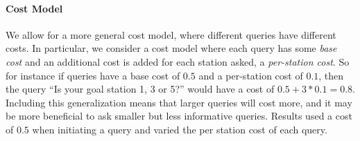 \documentclass[letterpaper]{article}
\begin{document}
    \paragraph{Cost Model} We allow for a more general cost model, where different queries have different costs. In particular, we consider a cost model where each query has some \emph{base cost} and an additional cost is added for each station asked, a \emph{per-station cost}. So for instance if queries have a base cost of $0.5$ and a per-station cost of $0.1$, then the query ``Is your goal station 1, 3 or 5?'' would have a cost of $0.5 + 3*0.1 = 0.8$. Including this generalization means that larger queries will cost more, and it may be more beneficial to ask smaller but less informative queries.
Results used a cost of $0.5$ when initiating a query and varied the per station cost of each query. 
\end{document}
